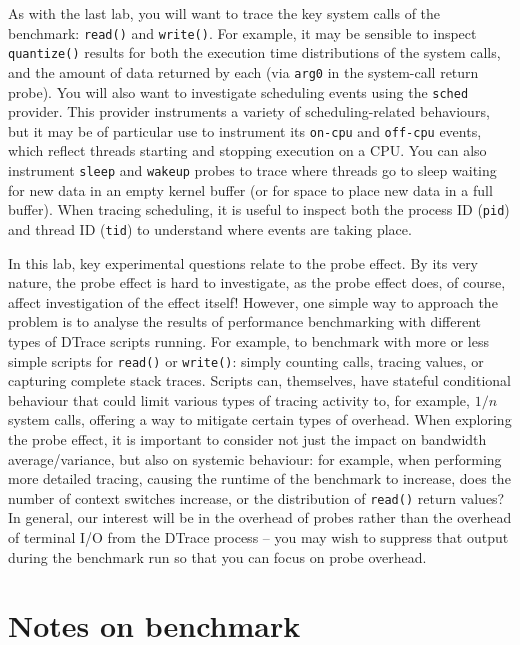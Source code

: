 \documentclass[a4paper,10pt]{article}
\begin{document}
As with the last lab, you will want to trace the key system calls of the
benchmark: \texttt{read()} and \texttt{write()}.
For example, it may be sensible to inspect \texttt{quantize()} results for
both the execution time distributions of the system calls, and the amount of
data returned by each (via \texttt{arg0} in the system-call return probe).
You will also want to investigate scheduling events using the \texttt{sched}
provider.
This provider instruments a variety of scheduling-related behaviours, but it
may be of particular use to instrument its \texttt{on-cpu} and
\texttt{off-cpu} events, which reflect threads starting and stopping
execution on a CPU.
You can also instrument \texttt{sleep} and \texttt{wakeup} probes to trace
where threads go to sleep waiting for new data in an empty kernel buffer (or
for space to place new data in a full buffer).
When tracing scheduling, it is useful to inspect both the process ID
(\texttt{pid}) and thread ID (\texttt{tid}) to understand where events are
taking place.

In this lab, key experimental questions relate to the probe effect.
By its very nature, the probe effect is hard to investigate, as the probe
effect does, of course, affect investigation of the effect itself!
However, one simple way to approach the problem is to analyse the results of
performance benchmarking with different types of DTrace scripts running.
For example, to benchmark with more or less simple scripts for \texttt{read()}
or \texttt{write()}: simply counting calls, tracing values, or capturing
complete stack traces.
Scripts can, themselves, have stateful conditional behaviour that could limit
various types of tracing activity to, for example, $1/n$ system calls,
offering a way to mitigate certain types of overhead.
When exploring the probe effect, it is important to consider not just the
impact on bandwidth average/variance, but also on systemic behaviour: for
example, when performing more detailed tracing, causing the runtime of the
benchmark to increase, does the number of context switches increase, or the
distribution of \texttt{read()} return values?
In general, our interest will be in the overhead of probes rather than the
overhead of terminal I/O from the DTrace process -- you may wish to suppress
that output during the benchmark run so that you can focus on probe overhead.

\section*{Notes on benchmark}
\end{document}
